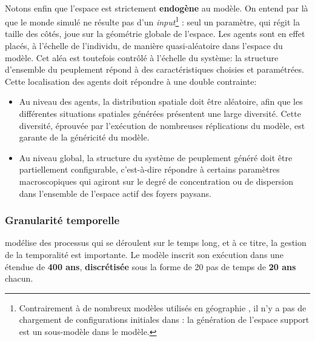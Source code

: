 \paragraph[Endogène]{} Notons enfin que l'espace est strictement \textbf{endogène} au modèle.
On entend par là que le monde simulé ne résulte pas d'un \textit{input}\footnote{
	Contrairement à de nombreux modèles utilisés en géographie \autocites[etc.]{white_use_1997,white_high-resolution_2000,dubos-paillard_analyse_2003,benenson_schelling_2009}, il n'y a pas de chargement de configurations initiales dans \simfeodal{} : la génération de l'espace support est un sous-modèle dans le modèle.
} : seul un paramètre, qui régit la taille des côtés, joue sur la géométrie globale de l'espace.
Les agents sont en effet placés, à l'échelle de l'individu, de manière quasi-aléatoire dans l'espace du modèle.
Cet aléa est toutefois contrôlé à l'échelle du système: la structure d'ensemble du peuplement répond à des caractéristiques choisies et paramétrées.
Cette localisation des agents doit répondre à une double contrainte:
\begin{itemize}
	\item Au niveau des agents, la distribution spatiale doit être aléatoire, afin que les différentes situations spatiales générées présentent une large diversité.
	Cette diversité, éprouvée par l'exécution de nombreuses réplications du modèle, est garante de la généricité du modèle.
	\item Au niveau global, la structure du système de peuplement généré doit être partiellement configurable, c'est-à-dire répondre à certains paramètres macroscopiques qui agiront sur le degré de concentration ou de dispersion dans l'ensemble de l'espace \og actif\fg{} des foyers paysans.
\end{itemize}


\subsubsection{Granularité temporelle \label{sssec:granularite-temporelle}}

\simfeodal{} modélise des processus qui se déroulent sur le temps long, et à ce titre, la gestion de la temporalité est importante.
Le modèle inscrit son exécution dans une étendue de \textbf{400 ans}, \textbf{discrétisée} sous la forme de 20 pas de temps de \textbf{20 ans} chacun.

